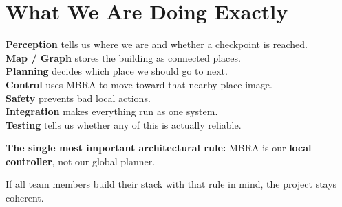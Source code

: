 \documentclass[11pt,a4paper]{article}
\begin{document}
\section{What We Are Doing Exactly}

\begin{mdframed}
\textbf{Perception} tells us where we are and whether a checkpoint is reached.\\
\textbf{Map / Graph} stores the building as connected places.\\
\textbf{Planning} decides which place we should go to next.\\
\textbf{Control} uses MBRA to move toward that nearby place image.\\
\textbf{Safety} prevents bad local actions.\\
\textbf{Integration} makes everything run as one system.\\
\textbf{Testing} tells us whether any of this is actually reliable.
\end{mdframed}

\begin{mdframed}
\textbf{The single most important architectural rule:}
MBRA is our \textbf{local controller}, not our global planner.
\end{mdframed}

If all team members build their stack with that rule in mind, the project
stays coherent.
\end{document}
